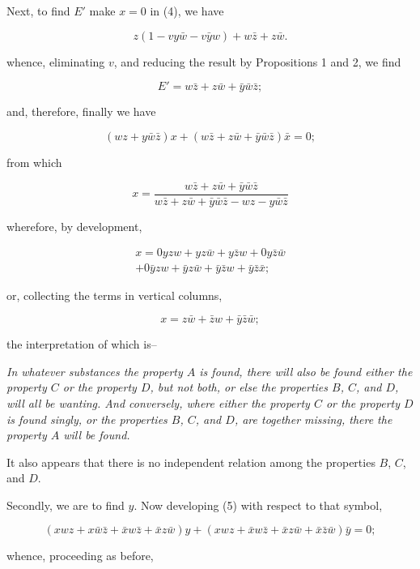 \documentclass[oneside]{book}
\begin{document}
Next, to find $E'$ make $x = 0$ in (4), we have

\[
z (1 - vy\bar{w} - v\bar{y}w) + w\bar{z} + z\bar{w}.
\]

whence, eliminating $v$, and reducing the result by Propositions
1 and 2, we find

\[
E' = w\bar{z} + z\bar{w} + \bar{y}\bar{w}\bar{z};
\]

and, therefore, finally we have

\begin{equation}
(wz + y\bar{w}\bar{z})x + (w\bar{z} + z\bar{w} + \bar{y}\bar{w}\bar{z})\bar{x} = 0;
\end{equation}

from which

\[
x =
\frac{w\bar{z} + z\bar{w} + \bar{y}\bar{w}\bar{z}}
{w\bar{z} + z\bar{w} + \bar{y}\bar{w}\bar{z} - wz - y\bar{w}\bar{z}}
\]

wherefore, by development,

\begin{eqnarray*}
x = 0yzw + yz\bar{w} + y\bar{z}w + 0y\bar{z}\bar{w}\\
  + 0\bar{y}zw + \bar{y}z\bar{w} + \bar{y}\bar{z}w + \bar{y}\bar{z}\bar{x};
\end{eqnarray*}

or, collecting the terms in vertical columns,

\begin{equation}
x = z\bar{w} + \bar{z}w + \bar{y}\bar{z}\bar{w};
\end{equation}

the interpretation of which is--

\textit{In whatever substances the property $A$ is found, there will also
be found either the property $C$ or the property $D$, but not both, or
else the properties $B$, $C$, and $D$, will all be wanting. And
conversely, where either the property $C$ or the property $D$ is found
singly, or the properties $B$, $C$, and $D$, are together missing, there
the property $A$ will be found.}

It also appears that there is no independent relation among
the properties $B$, $C$, and $D$.

Secondly, we are to find $y$. Now developing (5) with respect
to that symbol,

\[
(xwz + x\bar{w}\bar{z} + \bar{x}w\bar{z} + \bar{x}z\bar{w})y + (xwz + \bar{x}w\bar{z} + \bar{x}z\bar{w} + \bar{x}\bar{z}\bar{w})\bar{y} = 0;
\]

whence, proceeding as before,
\end{document}

